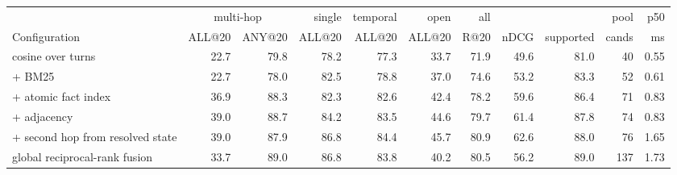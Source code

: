 \begin{tabular}{lrrrrrrrrrr}
\toprule
 & \multicolumn{2}{c}{multi-hop} & single & temporal & open & all & & & pool & p50 \\
\cmidrule(lr){2-3}
Configuration & ALL@20 & ANY@20 & ALL@20 & ALL@20 & ALL@20 & R@20 & nDCG & supported & cands & ms \\
\midrule
cosine over turns & 22.7 & 79.8 & 78.2 & 77.3 & 33.7 & 71.9 & 49.6 & 81.0 & 40 & 0.55 \\
+ BM25 & 22.7 & 78.0 & 82.5 & 78.8 & 37.0 & 74.6 & 53.2 & 83.3 & 52 & 0.61 \\
+ atomic fact index & 36.9 & 88.3 & 82.3 & 82.6 & 42.4 & 78.2 & 59.6 & 86.4 & 71 & 0.83 \\
+ adjacency & 39.0 & 88.7 & 84.2 & 83.5 & 44.6 & 79.7 & 61.4 & 87.8 & 74 & 0.83 \\
+ second hop from resolved state & 39.0 & 87.9 & 86.8 & 84.4 & 45.7 & 80.9 & 62.6 & 88.0 & 76 & 1.65 \\
\midrule
global reciprocal-rank fusion & 33.7 & 89.0 & 86.8 & 83.8 & 40.2 & 80.5 & 56.2 & 89.0 & 137 & 1.73 \\
\bottomrule
\end{tabular}
